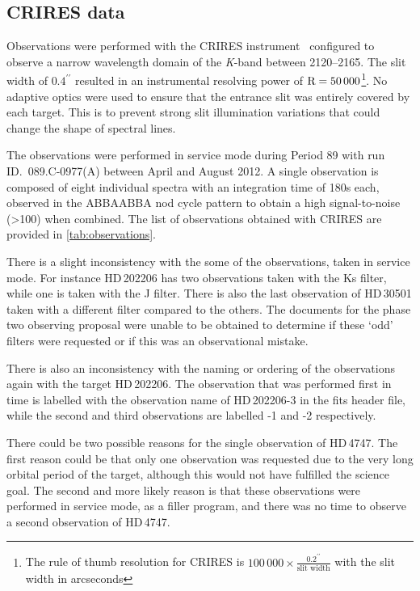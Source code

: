 \subsection{CRIRES data}
\label{subsec:CRIRES}
Observations were performed with the {CRIRES} instrument~\citep{kaeufl_crires_2004} configured to observe a narrow wavelength domain of the \emph{K}-band between 2120--2165\nm{}.
The slit width of \(0.4^{\prime\prime}\) resulted in an instrumental resolving power of \(\textrm{R}=50\,000\)\footnote{The rule of thumb resolution for {CRIRES} is \(100\,000\times \frac{0.2^{\prime\prime}}{\textrm{slit width}}\) with the slit width in arcseconds}.
No adaptive optics were used to ensure that the entrance slit was entirely covered by each target.
This is to prevent strong slit illumination variations that could change the shape of spectral lines.

The observations were performed in service mode during Period 89 with run {ID.~089.C-0977(A)} between April and August 2012.
A single observation is composed of eight individual spectra with an integration time of 180\si{\second} each, observed in the {ABBAABBA} nod cycle pattern to obtain a high signal-to-noise (>100) when combined.
The list of observations obtained with {CRIRES} are provided in \cref{tab:observations}.

There is a slight inconsistency with the some of the observations, taken in service mode.
For instance {HD\,202206} has two observations taken with the {Ks} filter, while one is taken with the {J} filter.
There is also the last observation of {HD\,30501} taken with a different filter compared to the others.
The documents for the phase two observing proposal were unable to be obtained to determine if these `odd' filters were requested or if this was an observational mistake.

There is also an inconsistency with the naming or ordering of the observations again with the target {HD\,202206}.
The observation that was performed first in time is labelled with the observation name of {HD\,202206-3} in the fits header file, while the second and third observations are labelled -1 and -2 respectively.

There could be two possible reasons for the single observation of {HD\,4747}.
The first reason could be that only one observation was requested due to the very long orbital period of the target, although this would not have fulfilled the science goal.
The second and more likely reason is that these observations were performed in service mode, as a filler program, and there was no time to observe a second observation of {HD\,4747}.

